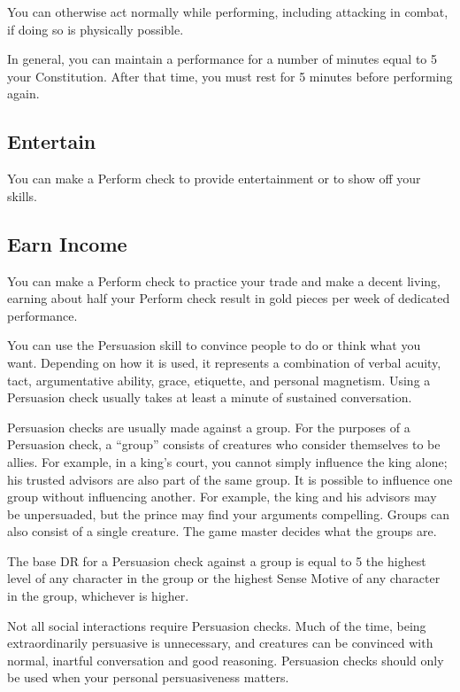         You can otherwise act normally while performing, including attacking in combat, if doing so is physically possible.

        In general, you can maintain a performance for a number of minutes equal to 5 \add your Constitution.
        After that time, you must rest for 5 minutes before performing again.

    \subsection{Entertain}
        You can make a Perform check to provide entertainment or to show off your skills.

    \subsection{Earn Income}
        You can make a Perform check to practice your trade and make a decent living, earning about half your Perform check result in gold pieces per week of dedicated performance.

\newpage
{}
        You can use the Persuasion skill to convince people to do or think what you want. Depending on how it is used, it represents a combination of verbal acuity, tact, argumentative ability, grace, etiquette, and personal magnetism. Using a Persuasion check usually takes at least a minute of sustained conversation.

        Persuasion checks are usually made against a group. For the purposes of a Persuasion check, a ``group'' consists of creatures who consider themselves to be allies. For example, in a king's court, you cannot simply influence the king alone; his trusted advisors are also part of the same group. It is possible to influence one group without influencing another. For example, the king and his advisors may be unpersuaded, but the prince may find your arguments compelling. Groups can also consist of a single creature. The game master decides what the groups are.

        The base DR for a Persuasion check against a group is equal to 5 \add the highest level of any character in the group or the highest Sense Motive of any character in the group, whichever is higher.

        Not all social interactions require Persuasion checks. Much of the time, being extraordinarily persuasive is unnecessary, and creatures can be convinced with normal, inartful conversation and good reasoning. Persuasion checks should only be used when your personal persuasiveness matters.

